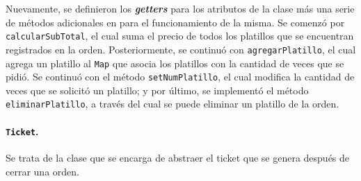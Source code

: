 Nuevamente, se definieron los \textit{\textbf{getters}} para los atributos de la clase 
más una serie de métodos adicionales en para el funcionamiento de la misma. Se comenzó por 
\texttt{calcularSubTotal}, el cual suma el precio de todos los platillos que se encuentran 
registrados en la orden. Posteriormente, se continuó con \texttt{agregarPlatillo}, el cual
agrega un platillo al \texttt{Map} que asocia los platillos con la cantidad de veces que 
se pidió. Se continuó con el método \texttt{setNumPlatillo}, el cual modifica la cantidad 
de veces que se solicitó un platillo; y por último, se implementó el método 
\texttt{eliminarPlatillo}, a través del cual se puede eliminar un platillo de la orden.

\paragraph{\texttt{Ticket}.} Se trata de la clase que se encarga de abstraer el 
ticket que se genera después de cerrar una orden.

\pagebreak
